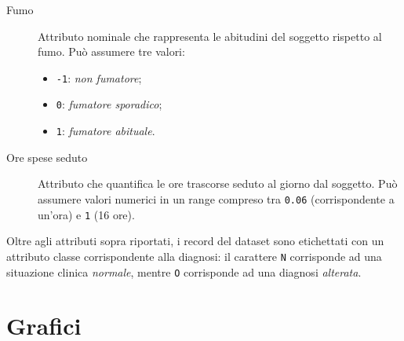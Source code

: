 \documentclass[a4paper,11pt,twoside,notitlepage,final]{scrartcl}
\begin{document}
\begin{description}
\begin{itemize}
    \end{itemize}
  \item[Fumo]
    Attributo nominale che rappresenta le abitudini del soggetto rispetto al fumo.
    Può assumere tre valori:
    \begin{itemize}
      \item \texttt{-1}: \emph{non fumatore};
      \item \texttt{0}: \emph{fumatore sporadico};
      \item \texttt{1}: \emph{fumatore abituale}.
    \end{itemize}
  \item[Ore spese seduto]
    Attributo che quantifica le ore trascorse seduto al giorno dal soggetto.
    Può assumere valori numerici in un range compreso tra \texttt{0.06} (corrispondente a un'ora) e \texttt{1} (16 ore).
  \end{description}

Oltre agli attributi sopra riportati, i record del dataset sono etichettati con un attributo classe corrispondente alla diagnosi:
il carattere \texttt{N} corrisponde ad una situazione clinica \emph{normale}, mentre \texttt{O} corrisponde ad una diagnosi \emph{alterata}.


\section{Grafici}
\end{document}
